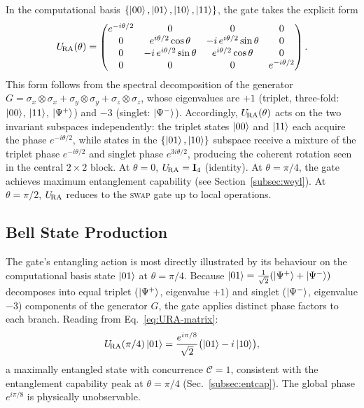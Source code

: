 In the computational basis $\{\ket{00}, \ket{01}, \ket{10}, \ket{11}\}$,
the gate takes the explicit form
\begin{equation}
  U_{\!\mathrm{RA}}(\theta) =
  \begin{pmatrix}
    e^{-i\theta/2} & 0 & 0 & 0 \\
    0 & e^{i\theta/2}\cos\theta & {-i}\,e^{i\theta/2}\sin\theta & 0 \\
    0 & {-i}\,e^{i\theta/2}\sin\theta & e^{i\theta/2}\cos\theta & 0 \\
    0 & 0 & 0 & e^{-i\theta/2}
  \end{pmatrix}.
  \label{eq:URA-matrix}
\end{equation}
This form follows from the spectral decomposition of the generator $G =
\sigma_x\!\otimes\!\sigma_x + \sigma_y\!\otimes\!\sigma_y + \sigma_z\!\otimes\!\sigma_z$,
whose eigenvalues are $+1$ (triplet, three-fold: $\ket{00}$, $\ket{11}$,
$\ket{\Psi^+}$) and $-3$ (singlet: $\ket{\Psi^-}$).
Accordingly, $U_{\!\mathrm{RA}}(\theta)$ acts on the two invariant subspaces independently:
the triplet states $\ket{00}$ and $\ket{11}$ each acquire the phase $e^{-i\theta/2}$,
while states in the $\{\ket{01},\ket{10}\}$ subspace receive a mixture of
the triplet phase $e^{-i\theta/2}$ and singlet phase $e^{3i\theta/2}$,
producing the coherent rotation seen in the central $2\times2$ block.
At $\theta = 0$, $U_{\!\mathrm{RA}} = \mathbf{I}_4$ (identity).
At $\theta = \pi/4$, the gate achieves maximum entanglement capability
(see Section~\ref{subsec:weyl}).
At $\theta = \pi/2$, $U_{\!\mathrm{RA}}$ reduces to the \textsc{swap} gate up to
local operations.

\subsection{Bell State Production}
\label{subsec:bell}

The gate's entangling action is most directly illustrated by its
behaviour on the computational basis state $\ket{01}$ at $\theta = \pi/4$.
Because $\ket{01} = \tfrac{1}{\sqrt{2}}(\ket{\Psi^+} + \ket{\Psi^-})$
decomposes into equal triplet ($\ket{\Psi^+}$, eigenvalue $+1$) and
singlet ($\ket{\Psi^-}$, eigenvalue $-3$) components of the generator $G$,
the gate applies distinct phase factors to each branch.
Reading from Eq.~\eqref{eq:URA-matrix}:
\begin{equation}
  U_{\!\mathrm{RA}}(\pi/4)\ket{01}
    = \frac{e^{i\pi/8}}{\sqrt{2}}\bigl(\ket{01} - i\ket{10}\bigr),
  \label{eq:bell-production}
\end{equation}
a maximally entangled state with concurrence $\mathcal{C} = 1$,
consistent with the entanglement capability peak at $\theta = \pi/4$
(Sec.~\ref{subsec:entcap}).
The global phase $e^{i\pi/8}$ is physically unobservable.

